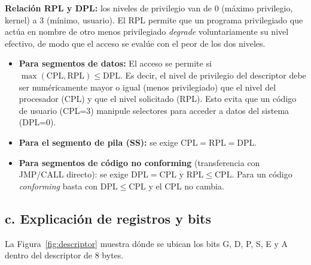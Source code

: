 \documentclass[RT]{UTNLSE}
\begin{document}
\textbf{Relación RPL y DPL:} los niveles de privilegio van de 0 (máximo privilegio, kernel) a 3 (mínimo, usuario). El RPL permite que un programa privilegiado que actúa en nombre de otro menos privilegiado \emph{degrade} voluntariamente su nivel efectivo, de modo que el acceso se evalúe con el peor de los dos niveles.
\begin{itemize}
    \item \textbf{Para segmentos de datos:} El acceso se permite si \(\max(\mathrm{CPL},\mathrm{RPL}) \leq \mathrm{DPL}\). Es decir, el nivel de privilegio del descriptor debe ser numéricamente mayor o igual (menos privilegiado) que el nivel del procesador (CPL) y que el nivel solicitado (RPL). Esto evita que un código de usuario (CPL=3) manipule selectores para acceder a datos del sistema (DPL=0).
    \item \textbf{Para el segmento de pila (SS):} se exige \(\mathrm{CPL}=\mathrm{RPL}=\mathrm{DPL}\).
    \item \textbf{Para segmentos de código no conforming} (transferencia con JMP/CALL directo): se exige \(\mathrm{DPL}=\mathrm{CPL}\) y \(\mathrm{RPL}\leq\mathrm{CPL}\). Para un código \emph{conforming} basta con \(\mathrm{DPL}\leq\mathrm{CPL}\) y el CPL no cambia.
\end{itemize}

\subsection*{c. Explicación de registros y bits}

La Figura~\ref{fig:descriptor} muestra dónde se ubican los bits G, D, P, S, E y A dentro del descriptor de 8 bytes.
\end{document}
